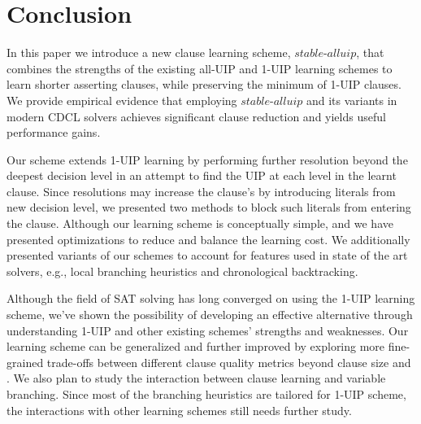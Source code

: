 \documentclass[runningheads]{llncs}
\newcommand{\oneuip}{1-UIP\xspace}
\newcommand{\alluip}{all-UIP\xspace}
\newcommand{\LBD}{\text{LBD}\xspace}
\newcommand{\stablealluip}{\textit{stable-alluip}\xspace}
\begin{document}
\section{Conclusion}
In this paper we introduce a new clause learning scheme, $\stablealluip$,
that combines the strengths of the existing \alluip and \oneuip learning
schemes to learn shorter asserting clauses, while preserving the
minimum \LBD of \oneuip clauses. We provide empirical evidence that
employing $\stablealluip$ and its variants in modern CDCL solvers achieves
significant clause reduction and yields useful performance gains.

Our scheme extends \oneuip learning by performing further resolution
beyond the deepest decision level in an attempt to find the UIP at
each level in the learnt clause. Since resolutions may increase the
clause's \LBD by introducing literals from new decision level, we
presented two methods to block such literals from entering the
clause. Although our learning scheme is conceptually simple, and we
have presented optimizations to reduce and balance the learning
cost. We additionally presented variants of our schemes to account for
features used in state of the art solvers, e.g., local branching
heuristics and chronological backtracking.

Although the field of SAT solving has long converged on using the
\oneuip learning scheme, we've shown the possibility of developing an
effective alternative through understanding \oneuip and other existing
schemes' strengths and weaknesses.  Our learning scheme can be
generalized and further improved by exploring more fine-grained
trade-offs between different clause quality metrics beyond clause size
and \LBD. We also plan to study the interaction between clause learning
and variable branching. Since most of the branching heuristics are
tailored for \oneuip scheme, the interactions with other learning
schemes still needs further study.

{}

\end{document}
